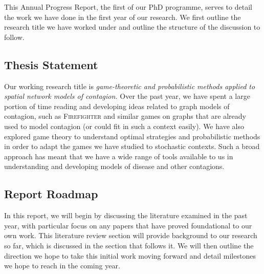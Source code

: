 \documentclass[../report.tex]{subfiles}
\begin{document}
This Annual Progress Report, the first of our PhD programme, serves to detail the work we have done in the first year of our research. We first outline the research title we have worked under and outline the structure of the discussion to follow.

\subsection{Thesis Statement}

Our working research title is {\it game-theoretic and probabilistic methods applied to spatial network models of contagion.} Over the past year, we have spent a large portion of time reading and developing ideas related to graph models of contagion, such as {\scshape Firefighter} and similar games on graphs that are already used to model contagion (or could fit in such a context easily). We have also explored game theory to understand optimal strategies and probabilistic methods in order to adapt the games we have studied to stochastic contexts. Such a broad approach has meant that we have a wide range of tools available to us in understanding and developing models of disease and other contagions.

\subsection{Report Roadmap}

In this report, we will begin by discussing the literature examined in the past year, with particular focus on any papers that have proved foundational to our own work. This literature review section will provide background to our research so far, which is discussed in the section that follows it. We will then outline the direction we hope to take this initial work moving forward and detail milestones we hope to reach in the coming year.
\end{document}
